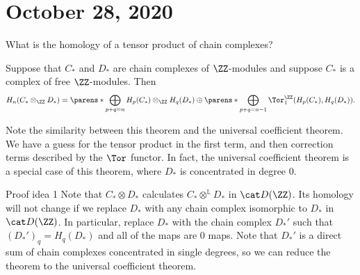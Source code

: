 \documentclass{standalone}
\begin{document}
\chapter{October 28, 2020}

\begin{question}
  What is the homology of a tensor product of chain complexes?
\end{question}

\begin{theorem}
  Suppose that \(C_*\) and \(D_*\) are chain complexes of \(\ZZ\)-modules
  and suppose \(C_*\) is a complex of free \(\ZZ\)-modules. Then
  \[
    H_n(C_* \otimes_\ZZ D_*)
      = \parens*{\bigoplus_{p + q = n} H_p(C_*) \otimes_\ZZ H_q(D_*)} \oplus
        \parens*{\bigoplus_{p + q = n-1} \Tor_1^{\ZZ}(H_p(C_*), H_q(D_*))}.
  \]
\end{theorem}

Note the similarity between this theorem and the universal coefficient theorem.
We have a guess for the tensor product in the first term,
and then correction terms described by the \(\Tor\) functor.
In fact, the universal coefficient theorem is a special case of this theorem,
where \(D_*\) is concentrated in degree \(0\).

\begin{proof*}{Proof idea 1}
  Note that \(C_* \otimes D_*\) calculates
  \(C_* \otimes^{\mathbb L} D_*\) in \(\der(\ZZ)\).
  Its homology will not change if we replace \(D_*\) with
  any chain complex isomorphic to \(D_*\) in \(\der(\ZZ)\).
  In particular, replace \(D_*\) with the chain complex \(D_*'\)
  such that \((D_*')_q = H_q(D_*)\) and all of the maps are \(0\) maps.
  Note that \(D_*'\) is a direct sum of
  chain complexes concentrated in single degrees,
  so we can reduce the theorem to the universal coefficient theorem.
\end{proof*}
\end{document}
